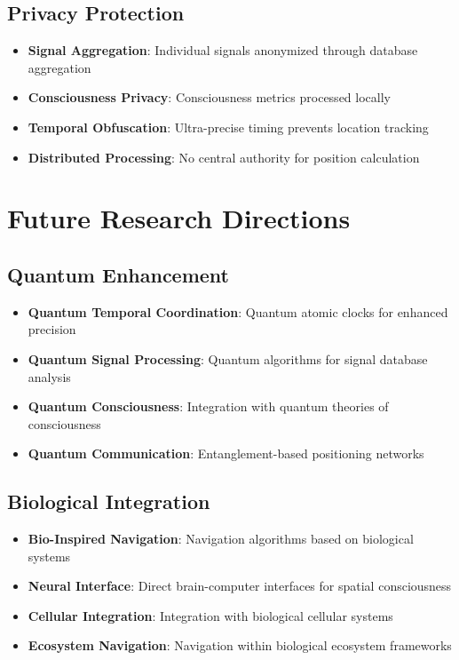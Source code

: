 \documentclass[12pt,a4paper]{article}
\begin{document}
\subsection{Privacy Protection}

\begin{itemize}
\item \textbf{Signal Aggregation}: Individual signals anonymized through database aggregation
\item \textbf{Consciousness Privacy}: Consciousness metrics processed locally
\item \textbf{Temporal Obfuscation}: Ultra-precise timing prevents location tracking
\item \textbf{Distributed Processing}: No central authority for position calculation
\end{itemize}

\section{Future Research Directions}

\subsection{Quantum Enhancement}

\begin{itemize}
\item \textbf{Quantum Temporal Coordination}: Quantum atomic clocks for enhanced precision
\item \textbf{Quantum Signal Processing}: Quantum algorithms for signal database analysis
\item \textbf{Quantum Consciousness}: Integration with quantum theories of consciousness
\item \textbf{Quantum Communication}: Entanglement-based positioning networks
\end{itemize}

\subsection{Biological Integration}

\begin{itemize}
\item \textbf{Bio-Inspired Navigation}: Navigation algorithms based on biological systems
\item \textbf{Neural Interface}: Direct brain-computer interfaces for spatial consciousness
\item \textbf{Cellular Integration}: Integration with biological cellular systems
\item \textbf{Ecosystem Navigation}: Navigation within biological ecosystem frameworks
\end{itemize}
\end{document}
